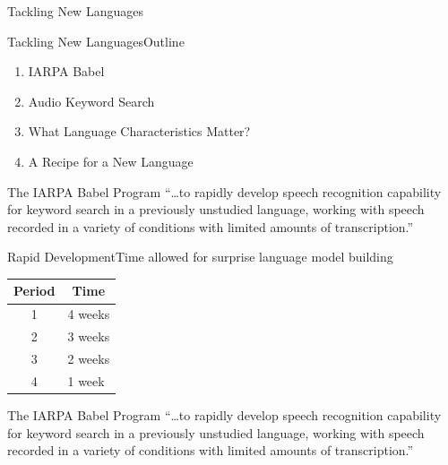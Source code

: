 \begin{frame}
  \begin{center}
    {\color{Maroon}\Huge Tackling New Languages}
  \end{center}
\end{frame}

\begin{frame}{Tackling New Languages}{Outline}
  \begin{enumerate}
  \item IARPA Babel
  \item Audio Keyword Search
  \item What Language Characteristics Matter?
  \item A Recipe for a New Language
  \end{enumerate}
\end{frame}

\begin{frame}{The IARPA Babel Program}{}
  \Large{``\ldots to \alert{rapidly develop} speech recognition
    capability for keyword search in a previously unstudied
    language, working with speech recorded in a variety of
    conditions with limited amounts of transcription.''}\par
\end{frame}

\begin{frame}{Rapid Development}{Time allowed for surprise language model building}
  \centering
  \begin{tabular}{@{}cl@{}} \toprule
    {\bf Period} & \multicolumn{1}{c}{\bf Time} \\ \midrule
    1 & 4 weeks \\
    2 & 3 weeks \\
    3 & 2 weeks \\
    4 & 1 week  \\ \bottomrule
  \end{tabular}
\end{frame}

\begin{frame}{The IARPA Babel Program}{}
  \Large{``\ldots to rapidly develop speech recognition
    capability for keyword search in a \alert{previously unstudied
      language}, working with speech recorded in a variety of
    conditions with limited amounts of transcription.''}\par
\end{frame}


